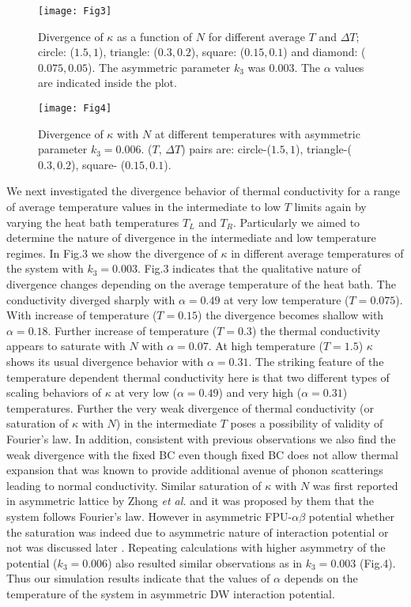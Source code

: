 \documentclass[aps,pre,reprint,groupedaddress]{revtex4-1}
\begin{document}
\begin{figure}
	\centering
	\texttt{[image: Fig3]}
	\caption{Divergence of $\kappa$ as a function of $N$ for different average $T$ and $\Delta T$;  circle: ($1.5,1$), triangle: ($0.3,0.2$), square: ($0.15,0.1$) and diamond: ($0.075,0.05$). The asymmetric parameter $k_3$ was $0.003$. The $\alpha$ values are indicated inside the plot.}
	\label{fig:fig3}
\end{figure}


\begin{figure}
	\centering
	\texttt{[image: Fig4]}
	\caption{Divergence of $\kappa$ with $N$ at different temperatures with asymmetric parameter $k_3=0.006$. ($T$, $\Delta T$) pairs are: circle-($1.5,1$), triangle-($0.3,0.2$), square- ($0.15,0.1$).}
	\label{fig:fig4}
\end{figure}

We next investigated the divergence behavior of thermal conductivity for a range of average temperature values in the intermediate to low $T$ limits again by varying the heat bath temperatures $T_L$ and $T_R$. Particularly we aimed to determine the nature of divergence in the intermediate and low temperature regimes. In Fig.3 we show the divergence of $\kappa$ in different average temperatures of the system with $k_3=0.003$. Fig.3 indicates that the qualitative nature of divergence changes depending on the average temperature of the heat bath. The conductivity diverged sharply with $\alpha=0.49$ at very low temperature ($T=0.075$). With increase of temperature ($T=0.15$) the divergence becomes shallow with $\alpha=0.18$. Further increase of temperature ($T=0.3$) the thermal conductivity appears to saturate with $N$ with $\alpha=0.07$. At high temperature ($T=1.5$) $\kappa$ shows its usual divergence behavior with $\alpha=0.31$. The striking feature of the temperature dependent thermal conductivity here is that two different types of scaling behaviors of $\kappa$ at very low ($\alpha=0.49$) and very high ($\alpha=0.31$) temperatures. Further the very weak divergence of thermal conductivity (or saturation of $\kappa$ with $N$) in the intermediate $T$ poses a possibility of validity of Fourier's law. In addition, consistent with previous observations \cite{Das2014,Savin2014} we also find the weak divergence with the fixed BC even though fixed BC does not allow thermal expansion that was known to provide additional avenue of phonon scatterings leading to normal conductivity. Similar saturation of $\kappa$ with $N$ was first reported in asymmetric lattice by Zhong \textit{et al.}\cite{Zhong2012a} and it was proposed by them that the system follows Fourier's law. However in asymmetric FPU-$\alpha\beta$ potential whether the saturation was indeed due to asymmetric nature of interaction potential or not was discussed later \cite{Das2014,Wang2013}. Repeating calculations with higher asymmetry of the potential ($k_3=0.006$) also resulted similar observations as in $k_3=0.003$ (Fig.4). Thus our simulation results indicate that the values of $\alpha$ depends on the temperature of the system in asymmetric DW interaction potential.
\end{document}
